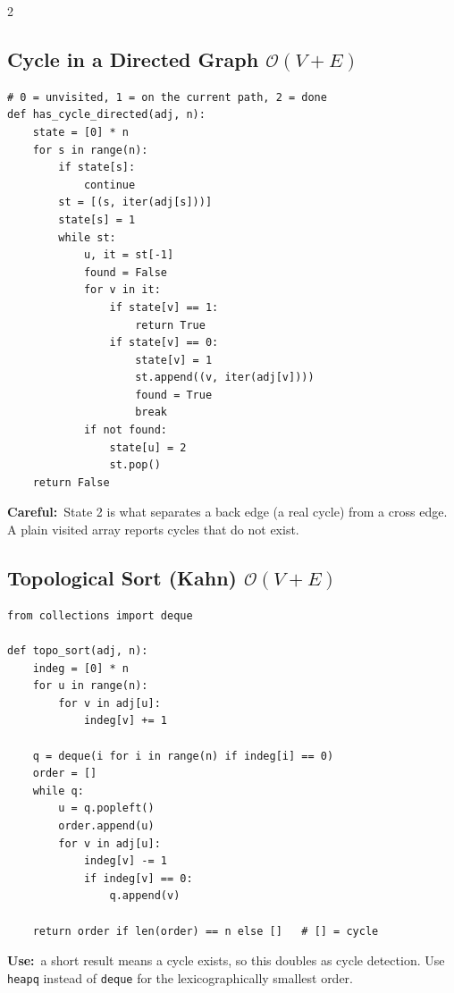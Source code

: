 \documentclass[10pt]{article}
\newcommand{\code}[1]{\texttt{\small #1}}
\newcommand{\sub}[2]{\subsection[#1]{#1\hspace{0.6em}%
  \textnormal{\color{accent2}\small$\mathcal{O}(#2)$}}}
\newcommand{\uses}[1]{{\color{accent2}\footnotesize\textbf{Use:}}~{\footnotesize #1}\par}
\newcommand{\warn}[1]{{\color{warnc}\footnotesize\textbf{Careful:}}~{\footnotesize #1}\par}
\begin{document}
\begin{multicols}{2}
\sub{Cycle in a Directed Graph}{V + E}
\begin{lstlisting}
# 0 = unvisited, 1 = on the current path, 2 = done
def has_cycle_directed(adj, n):
    state = [0] * n
    for s in range(n):
        if state[s]:
            continue
        st = [(s, iter(adj[s]))]
        state[s] = 1
        while st:
            u, it = st[-1]
            found = False
            for v in it:
                if state[v] == 1:
                    return True
                if state[v] == 0:
                    state[v] = 1
                    st.append((v, iter(adj[v])))
                    found = True
                    break
            if not found:
                state[u] = 2
                st.pop()
    return False
\end{lstlisting}
\warn{State 2 is what separates a back edge (a real cycle) from a cross
edge. A plain visited array reports cycles that do not exist.}

\sub{Topological Sort (Kahn)}{V + E}
\begin{lstlisting}
from collections import deque

def topo_sort(adj, n):
    indeg = [0] * n
    for u in range(n):
        for v in adj[u]:
            indeg[v] += 1

    q = deque(i for i in range(n) if indeg[i] == 0)
    order = []
    while q:
        u = q.popleft()
        order.append(u)
        for v in adj[u]:
            indeg[v] -= 1
            if indeg[v] == 0:
                q.append(v)

    return order if len(order) == n else []   # [] = cycle
\end{lstlisting}
\uses{a short result means a cycle exists, so this doubles as cycle
detection. Use \code{heapq} instead of \code{deque} for the
lexicographically smallest order.}

\end{multicols}

\end{document}
